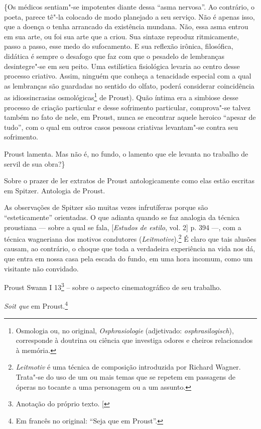 \{Os médicos sentiam"-se impotentes diante dessa ``asma nervosa''. Ao
contrário, o poeta, parece tê"-la colocado de modo planejado a seu
serviço. Não é apenas isso, que a doença o tenha arrancado da existência
mundana. Não, essa asma entrou em sua arte, ou foi sua arte que a criou.
Sua sintaxe reproduz ritmicamente, passo a passo, esse medo do
sufocamento. E sua reflexão irônica, filosófica, didática é sempre o
desafogo que faz com que o pesadelo de lembranças desintegre"-se em seu
peito. Uma estilística fisiológica levaria ao centro desse processo
criativo. Assim, ninguém que conheça a tenacidade especial com a qual as
lembranças são guardadas no sentido do olfato, poderá considerar
coincidência as idiossincrasias osmológicas\footnote{Osmologia ou,
  no original, \emph{Osphrasiologie} (adjetivado:
  \emph{osphrasilogisch}), corresponde à doutrina ou ciência que
  investiga odores e cheiros relacionados à memória. \versal{[N. E.]}} de Proust). Quão
íntima era a simbiose desse processo de criação particular e desse
sofrimento particular, comprova"-se talvez também no fato de nele, em
Proust, nunca se encontrar aquele heroico ``apesar de tudo'', com o qual em outros casos pessoas criativas levantam"-se contra seu sofrimento.

Proust lamenta. Mas não é, no fundo, o lamento que ele levanta no
trabalho de servil de sua obra?\}

Sobre o prazer de ler extratos de Proust antologicamente como elas estão
escritas em Spitzer. Antologia de Proust.

As observações de Spitzer são muitas vezes infrutíferas porque são
``esteticamente'' orientadas. O que adianta quando se faz analogia da
técnica proustiana --- sobre a qual se fala, {[}\emph{Estudos de estilo},
vol. 2{]} p. 394 ---, com a técnica wagneriana dos motivos condutores
(\emph{Leitmotive}).\footnote{\emph{Leitmotiv} é uma técnica de
  composição introduzida por Richard Wagner. Trata"-se do uso de um ou
  mais temas que se repetem em passagens de óperas no tocante a uma
  personagem ou a um assunto. \versal{[N. E.]}} É claro que tais alusões causam, ao
contrário, o choque que toda a verdadeira experiência na vida nos dá,
que entra em nossa casa pela escada do fundo, em uma hora incomum, como
um visitante não convidado.

Proust Swann I 13\footnote{Anotação do próprio texto. {[}\versal{N. T.}{]}} -- sobre o aspecto cinematográfico de seu trabalho.

\emph{Soit que} em Proust.\footnote{Em francês no original: ``Seja
  que em Proust''. \versal{[N. T.]}}

